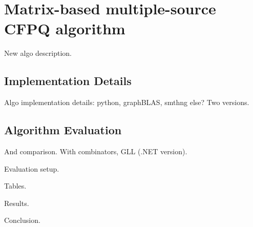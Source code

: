 \section{Matrix-based multiple-source CFPQ algorithm}

New algo description.

\subsection{Implementation Details}

Algo implementation details: python, graphBLAS, smthng else? Two versions.

\subsection{Algorithm Evaluation}

And comparison. With combinators, GLL (.NET version).

Evaluation setup.

Tables.

Results.

Conclusion. 